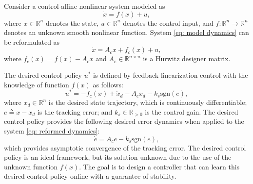 \documentclass[letterpaper, 10 pt, conference]{ieeeconf}  %
\begin{document}
Consider a control-affine nonlinear system modeled as 
\begin{equation}
    \dot x = f(x) + u,
    \label{eq: model dynamics}
\end{equation}
where $x\in \mathbb{R}^n$ denotes the state, $u\in\mathbb{R}^n$ denotes the control input, and $f:\mathbb{R}^n\to\mathbb{R}^n$ denotes an unknown smooth nonlinear function. System \eqref{eq: model dynamics} can be reformulated as 
\begin{equation}
    \dot x = A_c x + f_c(x) + u,
    \label{eq: reformed dynamics}
\end{equation}
where $f_c(x)= f(x) - A_c x$ and $A_c\in\mathbb{R}^{n\times n}$ is a Hurwitz designer matrix. 

The desired control policy $u^*$ is defined by feedback linearization control with the knowledge of function $f(x)$ as follows:
\begin{equation}
    u^* = -f_c(x) + \dot x_d - A_c x_d - k_s \text{sgn}(e),
    \label{eq: desired input}
\end{equation}
where $x_d\in\mathbb{R}^n$ is the desired state trajectory, which is continuously differentiable; $e\triangleq x-x_d$ is the tracking error; and $k_s\in\mathbb{R}_{>0}$ is the control gain.
The desired control policy provides the following desired error dynamics when applied to the system \eqref{eq: reformed dynamics}: 
\begin{equation}\label{eq: ideal error dynamics}
    \dot e = A_c e-k_s\text{sgn}(e),
\end{equation}
which provides asymptotic convergence of the tracking error. The desired control policy is an ideal framework, but its solution unknown due to the use of the unknown function $f(x)$. The goal is to design a controller that can learn this desired control policy online with a guarantee of stability.

\end{document}
